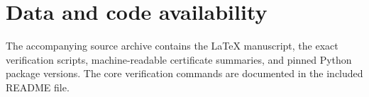 \documentclass[11pt]{amsart}
\theoremstyle{definition}
\begin{document}
\section*{Data and code availability}

The accompanying source archive contains the LaTeX manuscript, the exact
verification scripts, machine-readable certificate summaries, and pinned
Python package versions. The core verification commands are documented in
the included README file.

\newpage


\end{document}
